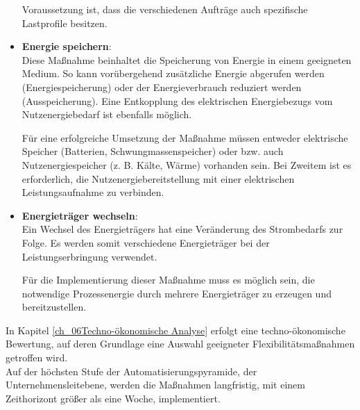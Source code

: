 \begin{itemize}[label={--}]
	Voraussetzung ist, dass die verschiedenen Aufträge auch spezifische Lastprofile besitzen. 
	\item \textbf{Energie speichern}: \\Diese Maßnahme beinhaltet die Speicherung von Energie in einem geeigneten Medium. So kann vorübergehend zusätzliche Energie abgerufen werden (Energiespeicherung) oder der Energieverbrauch reduziert werden (Ausspeicherung). Eine Entkopplung des elektrischen Energiebezugs vom Nutzenergiebedarf ist ebenfalls möglich. 
	
	Für eine erfolgreiche Umsetzung der Maßnahme müssen entweder elektrische Speicher (Batterien, Schwungmassenspeicher) oder bzw. auch Nutzenergiespeicher (z. B. Kälte, Wärme) vorhanden sein. Bei Zweitem ist es erforderlich, die Nutzenergiebereitstellung mit einer elektrischen Leistungsaufnahme zu verbinden. 
	\item \textbf{Energieträger wechseln}: \\Ein Wechsel des Energieträgers hat eine Veränderung des Strombedarfs zur Folge. Es werden somit verschiedene Energieträger bei der Leistungserbringung verwendet. 
	
	Für die Implementierung dieser Maßnahme muss es möglich sein, die notwendige Prozessenergie durch mehrere Energieträger zu erzeugen und bereitzustellen. 
\end{itemize}

In Kapitel \ref{ch_06Techno-ökonomische Analyse} erfolgt eine techno-ökonomische Bewertung, auf deren Grundlage eine Auswahl geeigneter Flexibilitätsmaßnahmen getroffen wird.\\

Auf der höchsten Stufe der Automatisierungspyramide, der Unternehmensleitebene, werden die Maßnahmen langfristig, mit einem Zeithorizont größer als eine Woche, implementiert. 


